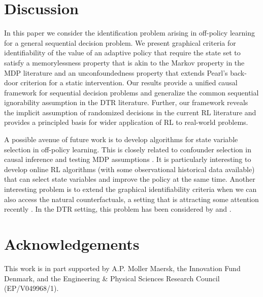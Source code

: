 \documentclass[12pt,a4paper]{article}
\theoremstyle{definition}
\begin{document}
\section{Discussion}
\label{sec:discussion}

In this paper we consider the identification problem arising in
off-policy learning for a general sequential decision problem. We present
graphical criteria for identifiability of the
value of an adaptive policy that require the state set to satisfy a
memorylessness property that is akin to the Markov property in the MDP
literature and an unconfoundedness property that extends Pearl's
back-door criterion for a static intervention. Our
results provide a unified causal framework for sequential decision
problems and generalize the common sequential ignorability assumption
in the DTR literature. Further, our framework reveals the
implicit assumption of randomized decisions in the current RL
literature and provides a principled basis for
wider application of RL to real-world problems.

A possible avenue of future work is to develop algorithms for state
variable selection in off-policy learning. This is closely related to confounder selection in causal inference
\parencite{guo_confounder_2023-1} and testing MDP assumptions
\parencite{shi2020does}. It is particularly interesting to
develop online RL algorithms (with some observational historical
data available) that can select state variables and improve the policy
at the same time. Another interesting problem is to extend the
graphical identifiability criteria when we can also access the natural
counterfactuals, a setting that is attracting some attention
recently \parencite{kallus2023efficient,stensrud2024optimal}. In the
DTR setting, this problem has been considered by
\textcite{young2014identification} and
\textcite{richardson_single_2013}.




\section*{Acknowledgements}
This work is in part supported by A.P. Moller Maersk, the
Innovation Fund Denmark, and the Engineering \& Physical Sciences
Research Council (EP/V049968/1).
\end{document}
